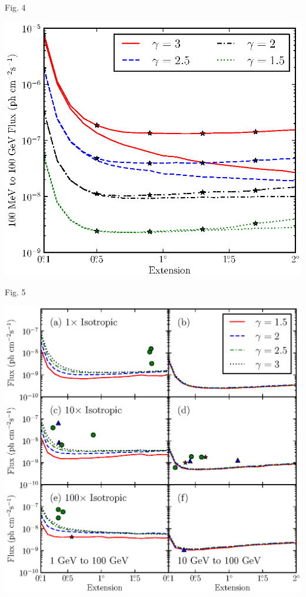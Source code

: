 \documentclass[12pt]{beamer}
\begin{document}
\begin{frame}{Fig. 4}
  \begin{center}
    \includegraphics[scale=0.5]{../paper/mc_plots/index_sensitivity_color.eps}
  \end{center}
\end{frame}

\begin{frame}{Fig. 5}
  \begin{center}
    \includegraphics[scale=0.5]{../paper/mc_plots/all_sensitivity_color.eps}
  \end{center}
\end{frame}
\end{document}
